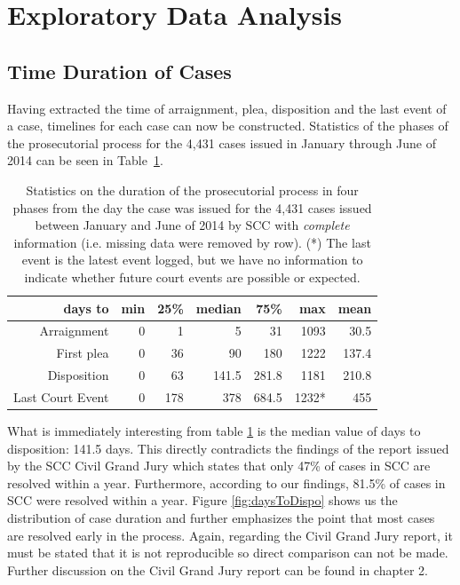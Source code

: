 \documentclass{AISB2008}
\begin{document}
\section{Exploratory Data Analysis}
\subsection{Time Duration of Cases}
Having extracted the time of arraignment, plea, disposition and the last event of a case, timelines for each case can now be constructed. Statistics of the phases of the prosecutorial process for the 4,431 cases issued in January through June of 2014 can be seen in Table~\ref{tab:timelines}.

\begin{table}
\centering
  \begin{tabular}{r|r|r|r|r|r|r}
days to            &min&25\%   &median&75\%   &max    &mean\\
\hline
Arraignment        &0    &1    &5          &31    &1093   &30.5\\
First plea        &0    &36    &90         &180&1222   &137.4\\
Disposition        &0    &63    &141.5      &281.8&1181   &210.8\\
Last Court Event&0    &178    &378    &684.5&1232*  &455\\
\hline
\end{tabular}
\caption{Statistics on the duration of the prosecutorial process in four phases from the day the case was issued for the 4,431 cases issued between January and June of 2014 by SCC with {\it complete} information (i.e. missing data were removed by row).
(*) The last event is the latest event logged, but we have no information to indicate whether future court events are possible or expected.
}
\label{tab:timelines}
\end{table}

What is immediately interesting from table \ref{tab:timelines} is the median value of days to disposition: 141.5 days. This directly contradicts the findings of the report issued by the SCC Civil Grand Jury which states that only 47\% of cases in SCC are resolved within a year. Furthermore, according to our findings, 81.5\% of cases in SCC were resolved within a year. Figure \ref{fig:daysToDispo} shows us the distribution of case duration and further emphasizes the point that most cases are resolved early in the process. Again, regarding the Civil Grand Jury report, it must be stated that it is not reproducible so direct comparison can not be made. Further discussion on the Civil Grand Jury report can be found in chapter 2. 
\end{document}
